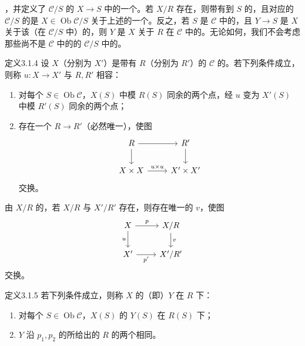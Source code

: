 ，并定义了 $\mathcal C/S$ 的 $X\to S$ 中的一个。若 $X/R$ 存在，则带有到 $S$ 的，且对应的 $\mathcal C/S$ 的是 $X\in\operatorname{Ob}\mathcal C/S$ 关于上述的一个。反之，若 $S$ 是 $\mathcal C$ 中的，且 $Y\to S$ 是 $X$ 关于该（在 $\mathcal C/S$ 中）的，则 $Y$ 是 $X$ 关于 $R$ 在 $\mathcal C$ 中的。无论如何，我们不会考虑那些尚不是 $\mathcal C$ 中的的 $\mathcal C/S$ 中的。
\begin{SGAresult}{定义}{3.1.4}
设 $X$（分别为 $X'$）是带有 $R$（分别为 $R'$）的 $\mathcal C$ 的。若下列条件成立，则称 $u:X\to X'$ 与 $R,R'$ 相容：
\begin{enumerate}
\item[(i)] 对每个 $S\in\operatorname{Ob}\mathcal C$，$X(S)$ 中模 $R(S)$ 同余的两个点，经 $u$ 变为 $X'(S)$ 中模 $R'(S)$ 同余的两个点；
\item[(ii)] 存在一个 $R\to R'$（必然唯一），使图
\[
\begin{tikzcd}R\arrow[r]\arrow[d]&R'\arrow[d]\\X\times X\arrow[r,"u\times u"]&X'\times X'\end{tikzcd}
\]
交换。
\end{enumerate}
\end{SGAresult}
由 $X/R$ 的，若 $X/R$ 与 $X'/R'$ 存在，则存在唯一的 $v$，使图
\[
\begin{tikzcd}X\arrow[r,"p"]\arrow[d,"u"']&X/R\arrow[d,"v"]\\X'\arrow[r,"p'"']&X'/R'\end{tikzcd}
\]
交换。
\begin{SGAresult}{定义}{3.1.5}
若下列条件成立，则称 $X$ 的（即）$Y$ 在 $R$ 下：
\begin{enumerate}
\item[(i)] 对每个 $S\in\operatorname{Ob}\mathcal C$，$X(S)$ 的 $Y(S)$ 在 $R(S)$ 下；
\item[(ii)] $Y$ 沿 $p_1,p_2$ 的所给出的 $R$ 的两个相同。
\end{enumerate}
\end{SGAresult}
